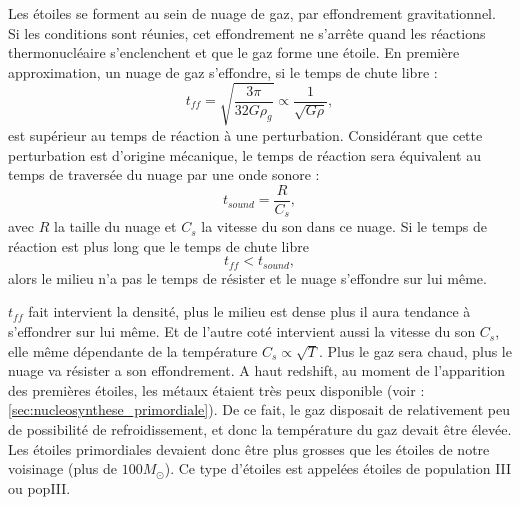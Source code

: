 Les étoiles se forment au sein de nuage de gaz, par effondrement gravitationnel.
Si les conditions sont réunies, cet effondrement ne s'arrête quand les réactions thermonucléaire s'enclenchent et que le gaz forme une étoile.
En première approximation, un nuage de gaz s'effondre, si le temps de chute libre : 
\begin{equation}
t_{ff} =  \sqrt{\frac{3\pi}{32G\rho_g}} \propto \frac{1}{\sqrt{G \rho}},
\label{eq:tff}
\end{equation}
est supérieur au temps de réaction à une perturbation.
Considérant que cette perturbation est d'origine mécanique, le temps de réaction sera équivalent au temps de traversée du nuage par une onde sonore :
 \begin{equation}
t_{sound} = \frac{R}{C_s},
\end{equation}
avec $R$ la taille du nuage et $C_s$ la vitesse du son dans ce nuage.
Si le temps de réaction est plus long que le temps de chute libre
\begin{equation}
t_{ff} < t_{sound},
\end{equation}
alors le milieu n'a pas le temps de résister et le nuage s'effondre sur lui même.

$t_{ff}$ fait intervient la densité, plus le milieu est dense plus il aura tendance à s'effondrer sur lui même.
Et de l'autre coté intervient aussi la vitesse du son $C_s$, elle même dépendante de la température $C_s \propto \sqrt{T}$.
Plus le gaz sera chaud, plus le nuage va résister a son effondrement.
A haut redshift, au moment de l'apparition des premières étoiles, les métaux étaient très peux disponible (voir :\ref{sec:nucleosynthese_primordiale}).
De ce fait, le gaz disposait de relativement peu de possibilité de refroidissement, et donc la température du gaz devait être élevée.
Les étoiles primordiales devaient donc être plus grosses que les étoiles de notre voisinage (plus de $100M_\odot$).
Ce type d'étoiles est appelées étoiles de population III ou popIII.

%

